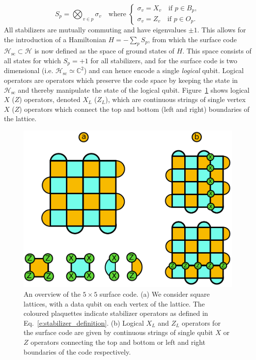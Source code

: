 \documentclass[twocolumn,preprintnumbers,amsmath,amssymb,notitlepage,nofootinbib,longbibliography,superscriptaddress,aps,pra,10pt]{revtex4-1}
\begin{document}
	\begin{equation}\label{e:stabilizer_definition}
		S_p = \bigotimes_{v\in p} \sigma_v \quad \text{where }
		\begin{cases}
			\sigma_v = X_v \quad \text{if } p \in B_p,\\
			\sigma_v = Z_v \quad \text{if } p \in O_p.
		\end{cases}
	\end{equation}
	All stabilizers are mutually commuting and have eigenvalues $\pm 1$. This allows for the introduction
	of a Hamiltonian $H = -\sum_p S_p$, from which the surface code $\mathcal{H}_\mathrm{sc} \subset \mathcal{H}$ is now defined as
	the space of ground states of $H$. This space consists of all states for which $S_p = +1$ for all stabilizers, and for the surface
	code is two dimensional (i.e. $\mathcal{H}_\mathrm{sc} \simeq \mathbb{C}^2$) and can hence encode a single \textit{logical} qubit.
	Logical operators are operators which preserve the code space by keeping the state in $\mathcal{H}_\mathrm{sc}$ and thereby
	manipulate the state of the logical qubit.
	Figure~\ref{f:surface_code} shows logical $X$ ($Z$) operators, denoted $X_L$ ($Z_L$), which are continuous strings of single
	vertex $X$ ($Z$) operators which connect the top and bottom (left and right) boundaries of the lattice.

	\begin{figure}
		\centering
		\includegraphics[width=0.8\linewidth]{figures/surface_code.pdf}
		\caption{
			An overview of the $5 \times 5$ surface code.
			(a) We consider square lattices, with a data qubit on each vertex of the lattice.
			The coloured plaquettes indicate stabilizer operators as defined in Eq.~\eqref{e:stabilizer_definition}.
			(b) Logical $X_L$ and $Z_L$ operators for the surface code are given by continuous strings of single qubit $X$ or $Z$ operators connecting the top and bottom or left and right boundaries of the code respectively.
		}
		\label{f:surface_code}
	\end{figure}
\end{document}
